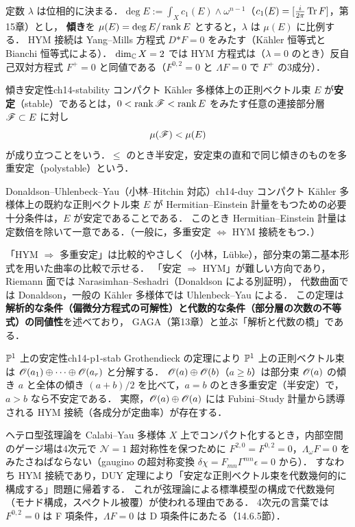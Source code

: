 定数 $\lambda$ は位相的に決まる．$\deg E := \int_X c_1(E)\wedge\omega^{n-1}$（$c_1(E)=[\frac{i}{2\pi}\operatorname{Tr} F]$，第15章）とし，
\textbf{傾き}を $\mu(E)=\deg E/\operatorname{rank} E$ とすると，$\lambda$ は $\mu(E)$ に比例する．
HYM 接続は Yang--Mills 方程式 $D{*F}=0$ をみたす（Kähler 恒等式と Bianchi 恒等式による）．
$\dim_{\mathbb{C}} X=2$ では HYM 方程式は（$\lambda=0$ のとき）反自己双対方程式 $F^+=0$ と同値である（$F^{0,2}=0$ と $\Lambda F=0$ で $F^+$ の3成分）．

\begin{mydef}{傾き安定性}{ch14-stability}
コンパクト Kähler 多様体上の正則ベクトル束 $E$ が\textbf{安定}（stable）であるとは，$0<\operatorname{rank}\mathscr{F}<\operatorname{rank} E$ をみたす任意の連接部分層 $\mathscr{F}\subset E$ に対し
\begin{equation}
  \mu(\mathscr{F}) < \mu(E)
\end{equation}
が成り立つことをいう．$\leq$ のとき半安定，安定束の直和で同じ傾きのものを多重安定（polystable）という．
\end{mydef}

\begin{mythm}{Donaldson--Uhlenbeck--Yau（小林--Hitchin 対応）}{ch14-duy}
コンパクト Kähler 多様体上の既約な正則ベクトル束 $E$ が Hermitian--Einstein 計量をもつための必要十分条件は，$E$ が安定であることである．
このとき Hermitian--Einstein 計量は定数倍を除いて一意である．（一般に，多重安定 $\Leftrightarrow$ HYM 接続をもつ．）
\end{mythm}

「HYM $\Rightarrow$ 多重安定」は比較的やさしく（小林，Lübke），部分束の第二基本形式を用いた曲率の比較で示せる．
「安定 $\Rightarrow$ HYM」が難しい方向であり，Riemann 面では Narasimhan--Seshadri（Donaldson による別証明），
代数曲面では Donaldson，一般の Kähler 多様体では Uhlenbeck--Yau による．
この定理は\textbf{解析的な条件（偏微分方程式の可解性）と代数的な条件（部分層の次数の不等式）の同値性}を述べており，
GAGA（第13章）と並ぶ「解析と代数の橋」である．

\begin{myex}{$\mathbb{P}^1$ 上の安定性}{ch14-p1-stab}
Grothendieck の定理により $\mathbb{P}^1$ 上の正則ベクトル束は $\mathscr{O}(a_1)\oplus\cdots\oplus\mathscr{O}(a_r)$ と分解する．
$\mathscr{O}(a)\oplus\mathscr{O}(b)$（$a\geq b$）は部分束 $\mathscr{O}(a)$ の傾き $a$ と全体の傾き $(a+b)/2$ を比べて，$a=b$ のとき多重安定（半安定）で，$a>b$ なら不安定である．
実際，$\mathscr{O}(a)\oplus\mathscr{O}(a)$ には Fubini--Study 計量から誘導される HYM 接続（各成分が定曲率）が存在する．
\end{myex}

\begin{physbox}
ヘテロ型弦理論を Calabi--Yau 多様体 $X$ 上でコンパクト化するとき，内部空間のゲージ場は4次元で $\mathcal{N}=1$ 超対称性を保つために
$F^{2,0}=F^{0,2}=0$，$\Lambda_\omega F = 0$ をみたさねばならない（gaugino の超対称変換 $\delta\chi = F_{mn}\Gamma^{mn}\epsilon=0$ から）．
すなわち HYM 接続であり，DUY 定理により「安定な正則ベクトル束を代数幾何的に構成する」問題に帰着する．
これが弦理論による標準模型の構成で代数幾何（モナド構成，スペクトル被覆）が使われる理由である．
4次元の言葉では $F^{0,2}=0$ は F 項条件，$\Lambda F=0$ は D 項条件にあたる（14.6.5節）．
\end{physbox}

